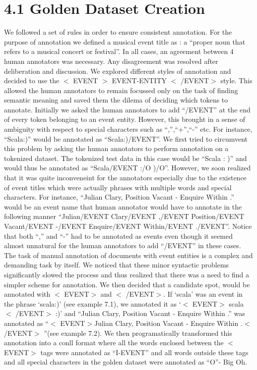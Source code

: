 \documentclass[a4paper,11pt]{report}
\begin{document}
\section*{4.1 Golden Dataset Creation}
We followed a set of rules in order to ensure consistent annotation. For the purpose of annotation we defined a musical event title as : a ``proper noun that refers to a musical concert or festival''. In all cases, an agreement between 4 human annotators was necessary. Any disagreement was resolved after deliberation and discussion. We explored different styles of annotation and decided to use the $<$ EVENT $>$ EVENT-ENTITY $<$ /EVENT$>$ style. This allowed the human annotators to remain focussed only on the task of finding semantic meaning and saved them the dilema of deciding which tokens to annotate. Initially we asked the human annotators to add ``/EVENT'' at the end of every token belonging to an event entity. However, this brought in a sense of ambiguity with respect to special characters such as ``,'',``+'',``-'' etc. For instance, ``Scala:)'' would be annotated as ``Scala:)/EVENT''. We first tried to circumvent this problem by asking the human annotators to perform annotation on a tokenized dataset. The tokenized test data in this case would be ``Scala : )'' and would thus be annotated as ``Scala/EVENT :/O )/O''. However, we soon realized that it was quite inconveneint for the annotators especially due to the existence of event titles which were actually phrases with multiple words and special characters. For instance, ``Julian Clary, Position Vacant - Enquire Within .'' would be an event name that human annotator would have to annotate in the following manner ``Julian/EVENT Clary/EVENT ,/EVENT Position/EVENT Vacant/EVENT -/EVENT Enquire/EVENT Within/EVENT ./EVENT''. Notice that both ``,'' and ``-'' had to be annotated as events even though it seemed almost unnatural for the human annotators to add ``/EVENT'' in these cases. The task of manual annotation of documents with event entities is a complex and demanding task by itself. We noticed that these minor syntactic problems significantly slowed the process and thus realized that there was a need to find a simpler scheme for annotation. We then decided that a candidate spot, would be annotated with $<$ EVENT$>$ and $<$ /EVENT$>$. If `scala' was an event in the phrase `scala:)' (see example 7.1), we annotated it as `$<$ EVENT$>$ scala $<$ /EVENT$>$ :)' and ``Julian Clary, Position Vacant - Enquire Within .'' was annotated as ``$<$ EVENT$>$Julian Clary, Position Vacant - Enquire Within .$<$ /EVENT$>$ ''(see example 7.2). We then programatically transformed this annotation into a conll format where all the words enclosed between the $<$ EVENT$>$ tags were annotated as ``I-EVENT'' and all words outside these tags and all special characters in the golden dataset were annotated as ``O''- Big Oh. \newline
\end{document}
